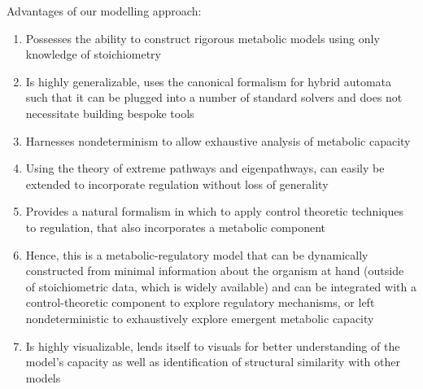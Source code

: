 Advantages of our modelling approach:
\begin{enumerate}
    \item Possesses the ability to construct rigorous metabolic models using only knowledge of stoichiometry
    \item Is highly generalizable, uses the canonical formalism for hybrid automata such that it can be plugged into a number of standard solvers and does not necessitate building bespoke tools
    \item Harnesses nondeterminism to allow exhaustive analysis of metabolic capacity
    \item Using the theory of extreme pathways and eigenpathways, can easily be extended to incorporate regulation without loss of generality
    \item Provides a natural formalism in which to apply control theoretic techniques to regulation, that also incorporates a metabolic component
    \item Hence, this is a metabolic-regulatory model that can be dynamically constructed from minimal information about the organism at hand (outside of stoichiometric data, which is widely available) and can be integrated with a control-theoretic component to explore regulatory mechanisms, or left nondeterministic to exhaustively explore emergent metabolic capacity
    \item Is highly visualizable, lends itself to visuals for better understanding of the model's capacity as well as identification of structural similarity with other models
\end{enumerate}



